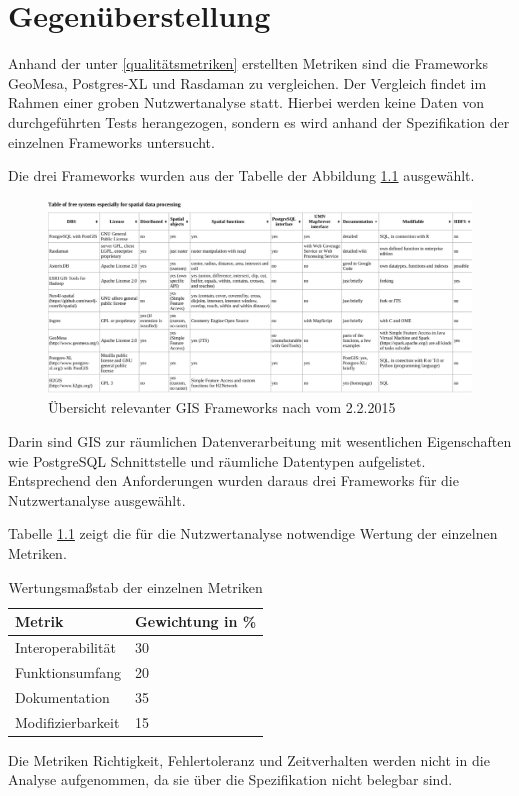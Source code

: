 \chapter{Gegenüberstellung}

Anhand der unter \ref{qualitätsmetriken} erstellten Metriken sind die Frameworks GeoMesa, Postgres-XL und Rasdaman zu vergleichen.
Der Vergleich findet im Rahmen einer groben Nutzwertanalyse statt.
Hierbei werden keine Daten von durchgeführten Tests herangezogen, sondern es wird anhand der Spezifikation der einzelnen Frameworks untersucht.

Die drei Frameworks wurden aus der Tabelle der Abbildung \ref{fig:spatialdatabases} ausgewählt.
\begin{figure}
\centering
\includegraphics[width=\textwidth]{Abbildungen/table_spatialdatabases.pdf}
\caption[Übersicht relevanter GIS Frameworks]{Übersicht relevanter GIS Frameworks nach \cite{website:wiki-spatialdatabase} vom 2.2.2015}
\label{fig:spatialdatabases}
\end{figure}
Darin sind GIS zur räumlichen Datenverarbeitung mit wesentlichen Eigenschaften wie PostgreSQL Schnittstelle und räumliche Datentypen aufgelistet.
Entsprechend den Anforderungen wurden daraus drei Frameworks für die Nutzwertanalyse ausgewählt.


Tabelle \ref{table:Wertungsmassstab} zeigt die für die Nutzwertanalyse notwendige Wertung der einzelnen Metriken.
\begin{table}[h]
\centering
\begin{tabular}{l|l}
\textbf{Metrik} & \textbf{Gewichtung in \%} \\ \hline
Interoperabilität & 30 \\ \hline
Funktionsumfang & 20 \\ \hline
Dokumentation & 35 \\ \hline
Modifizierbarkeit & 15
\end{tabular}
\caption{Wertungsmaßstab der einzelnen Metriken}
\label{table:Wertungsmassstab}
\end{table}
Die Metriken Richtigkeit, Fehlertoleranz und Zeitverhalten werden nicht in die Analyse aufgenommen, da sie über die Spezifikation nicht belegbar sind.

